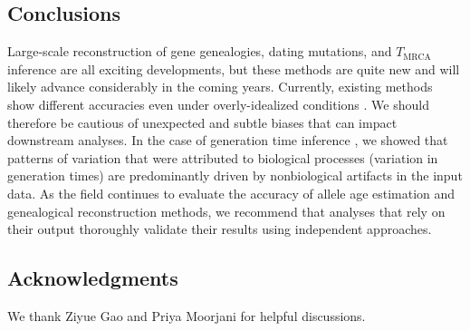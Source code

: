 \documentclass[]{article}
\begin{document}
%
%

\subsection*{Conclusions}

Large-scale reconstruction of gene genealogies, dating mutations, and
$T_\text{MRCA}$ inference are all exciting developments, but these methods are
quite new and will likely advance considerably in the coming years. Currently,
existing methods show different accuracies even under overly-idealized
conditions \citep{brandt2022evaluation}. We should therefore be cautious of
unexpected and subtle biases that can impact downstream analyses. In the case
of generation time inference \citep{wang2023human}, we showed that patterns of
variation that were attributed to biological processes (variation in generation
times) are predominantly driven by nonbiological artifacts in the input data.
As the field continues to evaluate the accuracy of allele age estimation and
genealogical reconstruction methods, we recommend that analyses that rely on
their output thoroughly validate their results using independent approaches.

\subsection*{Acknowledgments}

We thank Ziyue Gao and Priya Moorjani for helpful discussions.



\end{document}
